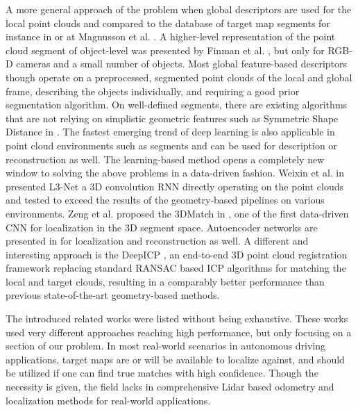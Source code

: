 \documentclass[letterpaper, 10 pt, conference]{ieeeconf}  %
\begin{document}
A more general approach of the problem when global descriptors are used for the local point clouds and compared to the database of target map segments for instance in \cite{rohling} or at Magnusson et al. \cite{magnusson}.
A higher-level representation of the point cloud segment of object-level was presented by Finman et al. \cite{object}, but only for RGB-D cameras and a small number of objects. Most global feature-based descriptors though operate on a preprocessed, segmented point clouds of the local and global frame, describing the objects individually, and requiring a good prior segmentation algorithm. On well-defined segments, there are existing algorithms that are not relying on simplistic geometric features such as Symmetric Shape Distance in \cite{ssdistance}. The fastest emerging trend of deep learning is also applicable in point cloud environments such as segments and can be used for description or reconstruction as well. The learning-based method opens a completely new window to solving the above problems in a data-driven fashion. Weixin et al. in \cite{l3net} presented L3-Net a 3D convolution RNN directly operating on the point clouds and tested to exceed the results of the geometry-based pipelines on various environments. Zeng et al. proposed the 3DMatch in \cite{3dmatch}, one of the first data-driven CNN for localization in the 3D segment space. Autoencoder networks are presented in \cite{autoe1, autoe2} for localization and reconstruction as well. A different and interesting approach is the DeepICP \cite{deepicp}, an end-to-end 3D point cloud registration framework replacing standard RANSAC based ICP algorithms for matching the local and target clouds, resulting in a comparably better performance than previous state-of-the-art geometry-based methods. %

The introduced related works were listed without being exhaustive. 
These works used very different approaches reaching high performance, but only focusing on a section of our problem. In most real-world scenarios in autonomous driving applications, target maps are or will be available to localize against, and should be utilized if one can find true matches with high confidence. Though the necessity is given, the field lacks in comprehensive Lidar based odometry and localization methods for real-world applications.
\end{document}
